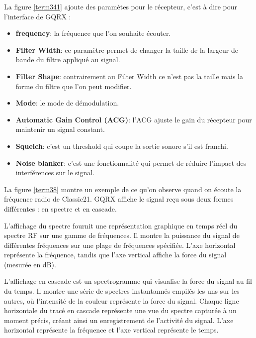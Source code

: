 \vspace{0.1cm}

La figure \ref{term341} ajoute des paramètes pour le récepteur, c'est à dire pour l'interface de GQRX :

\vspace{0.1cm}

\begin{itemize}
\item \textbf{frequency}: la fréquence que l'on souhaite écouter.
\item \textbf{Filter Width}: ce paramètre permet de changer la taille de la largeur de bande du filtre appliqué au signal.
\item \textbf{Filter Shape}: contrairement au Filter Width ce n'est pas la taille mais la forme du filtre que l'on peut modifier.
\item \textbf{Mode}: le mode de démodulation.
\item \textbf{Automatic Gain Control (ACG)}: l'ACG ajuste le gain du récepteur pour maintenir un signal constant.
\item \textbf{Squelch}: c'est un threshold qui coupe la sortie sonore s'il est franchi.
\item \textbf{Noise blanker}: c'est une fonctionnalité qui permet de réduire l'impact des interférences sur le signal.
\end{itemize}

\vspace{0.1cm}

La figure \ref{term38} montre un exemple de ce qu'on observe quand on écoute la fréquence radio de Classic21. GQRX affiche le signal reçu sous deux formes différentes : en spectre et en cascade.

\vspace{0.1cm}

L'affichage du spectre fournit une représentation graphique en temps réel du spectre RF sur une gamme de fréquences.
Il montre la puissance du signal de différentes fréquences sur une plage de fréquences spécifiée.
L'axe horizontal représente la fréquence, tandis que l'axe vertical affiche la force du signal (mesurée en dB).

\vspace{0.1cm}

L'affichage en cascade est un spectrogramme qui visualise la force du signal au fil du temps.
Il montre une série de spectres instantannés empilés les uns sur les autres, où l'intensité de la couleur représente la force du signal.
Chaque ligne horizontale du tracé en cascade représente une vue du spectre capturée à un moment précis, créant ainsi un enregistrement de l'activité du signal.
L'axe horizontal représente la fréquence et l'axe vertical représente le temps.

